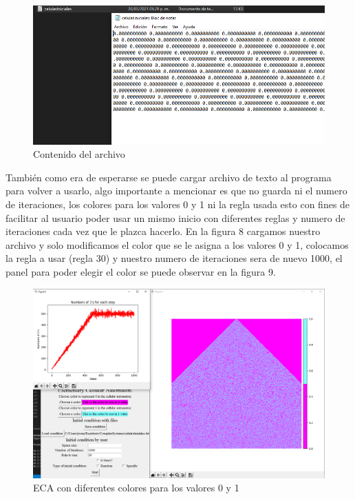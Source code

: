 \documentclass[11pt]{article}
\begin{document}
		\begin{figure}[H]
			\centering
			\includegraphics[scale=0.5]{resources/archivoSave2.png}
			\caption{Contenido del archivo}\label{fig:picture}
		\end{figure}
		También como era de esperarse se puede cargar archivo de texto al programa para volver a usarlo, algo importante a mencionar es que no guarda ni el numero de iteraciones, los colores para los valores 0 y 1 ni la regla usada esto con fines de facilitar al usuario poder usar un mismo inicio con diferentes reglas y numero de iteraciones cada vez que le plazca hacerlo. En la figura 8 cargamos nuestro archivo y solo modificamos el color que se le asigna a los valores 0 y 1, colocamos la regla a usar (regla 30) y nuestro numero de iteraciones sera de nuevo 1000, el panel para poder elegir el color se puede observar en la figura 9.
		\begin{figure}[H]
			\centering
			\includegraphics[scale=0.42]{resources/automataHappy.png}
			\caption{ECA con diferentes colores para los valores 0 y 1}\label{fig:picture}
		\end{figure}
\end{document}
